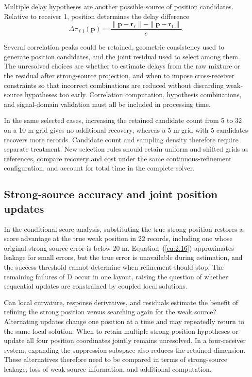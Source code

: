 \documentclass[11pt,a4paper]{article}
\numberwithin{equation}{section}
\numberwithin{figure}{section}
\numberwithin{table}{section}
\begin{document}
Multiple delay hypotheses are another possible source of position candidates. Relative to receiver 1, position determines the delay difference
\begin{equation}\label{eq:4.1}
\Delta\tau_{\ell1}(\mathbf{p}) = \frac{\|\mathbf{p}-\mathbf{r}_\ell\|-\|\mathbf{p}-\mathbf{r}_1\|}{c}.
\end{equation}

Several correlation peaks could be retained, geometric consistency used to generate position candidates, and the joint residual used to select among them\cite{ref01,ref02,ref03}. The unresolved choices are whether to estimate delays from the raw mixture or the residual after strong-source projection, and when to impose cross-receiver constraints so that incorrect combinations are reduced without discarding weak-source hypotheses too early. Correlation computation, hypothesis combinations, and signal-domain validation must all be included in processing time.

In the same selected cases, increasing the retained candidate count from 5 to 32 on a 10 m grid gives no additional recovery, whereas a 5 m grid with 5 candidates recovers more records. Candidate count and sampling density therefore require separate treatment. New selection rules should retain uniform and shifted grids as references, compare recovery and cost under the same continuous-refinement configuration, and account for total time in the complete solver.

\Needspace{.23\textheight}
\subsection{Strong-source accuracy and joint position updates}\label{sec:4.3}

In the conditional-score analysis, substituting the true strong position restores a score advantage at the true weak position in 22 records, including one whose original strong-source error is below 20 m. Equation~(\ref{eq:2.16}) approximates leakage for small errors, but the true error is unavailable during estimation, and the success threshold cannot determine when refinement should stop. The remaining failures of D occur in one layout, raising the question of whether sequential updates are constrained by coupled local solutions.

Can local curvature, response derivatives, and residuals estimate the benefit of refining the strong position versus searching again for the weak source? Alternating updates change one position at a time and may repeatedly return to the same local solution. When to retain multiple strong-position hypotheses or update all four position coordinates jointly remains unresolved. In a four-receiver system, expanding the suppression subspace also reduces the retained dimension\cite{ref07}. These alternatives therefore need to be compared in terms of strong-source leakage, loss of weak-source information, and additional computation.

\clearpage
\end{document}
